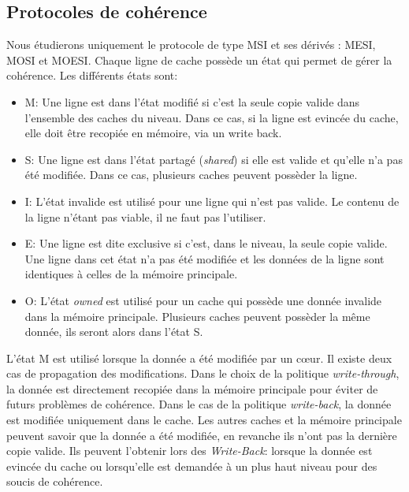 \subsection{Protocoles de cohérence}
 Nous étudierons uniquement le protocole de type MSI et ses dérivés : MESI, MOSI et MOESI. Chaque ligne de cache possède un état qui permet de gérer la cohérence. Les différents états sont: \\
\begin{itemize}
\item M: Une ligne est dans l'état modifié si c'est la seule copie valide dans l'ensemble des caches du niveau. Dans ce cas, si la ligne est evincée du cache, elle doit être recopiée en mémoire, via un write back. \\
\item S: Une ligne est dans l'état partagé (\textit{shared}) si elle est valide et qu'elle n'a pas été modifiée. Dans ce cas, plusieurs caches peuvent possèder la ligne. \\
\item I: L'état invalide est utilisé pour une ligne qui n'est pas valide. Le contenu de la ligne n'étant pas viable, il ne faut pas l'utiliser. \\
\item E: Une ligne est dite exclusive si c'est, dans le niveau, la seule copie valide. Une ligne dans cet état n'a pas été modifiée et les données de la ligne sont identiques à celles de la mémoire principale. \\
\item O: L'état \textit{owned} est utilisé pour un cache qui possède une donnée invalide dans la mémoire principale. Plusieurs caches peuvent possèder la même donnée, ils seront alors dans l'état S. \\
\end{itemize}

L'état M est utilisé lorsque la donnée a été modifiée par un c{\oe}ur. Il existe deux cas de propagation des modifications. Dans le choix de la politique \textit{write-through}, la donnée est directement recopiée dans la mémoire principale pour éviter de futurs problèmes de cohérence. Dans le cas de la politique \textit{write-back}, la donnée est modifiée uniquement dans le cache. Les autres caches et la mémoire principale peuvent savoir que la donnée a été modifiée, en revanche ils n'ont pas la dernière copie valide. Ils peuvent l'obtenir lors des \textit{Write-Back}: lorsque la donnée est evincée du cache ou lorsqu'elle est demandée à un plus haut niveau pour des soucis de cohérence.\\


